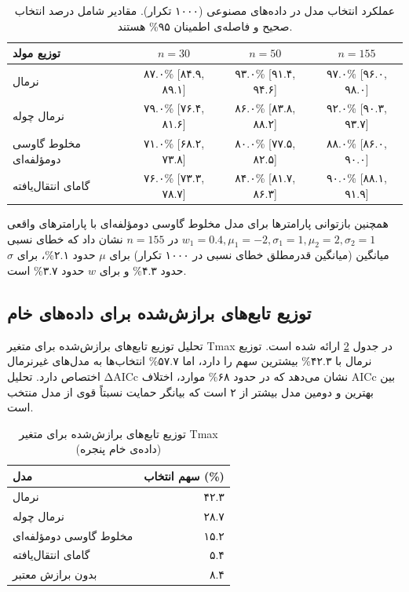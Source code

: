 \documentclass[12pt,a4paper,twocolumn]{article}
\begin{document}
\begin{table}[h]
\centering
\caption{عملکرد انتخاب مدل در داده‌های مصنوعی (۱۰۰۰ تکرار). مقادیر شامل درصد انتخاب صحیح و فاصله‌ی اطمینان ۹۵\% هستند.}
\label{tab:validation}
\begin{tabular}{l c c c}
\toprule
\textbf{توزیع مولد} & \textbf{$n=30$} & \textbf{$n=50$} & \textbf{$n=155$} \\
\midrule
نرمال & ۸۷.۰\% [۸۴.۹, ۸۹.۱] & ۹۳.۰\% [۹۱.۴, ۹۴.۶] & ۹۷.۰\% [۹۶.۰, ۹۸.۰] \\
نرمال چوله & ۷۹.۰\% [۷۶.۴, ۸۱.۶] & ۸۶.۰\% [۸۳.۸, ۸۸.۲] & ۹۲.۰\% [۹۰.۳, ۹۳.۷] \\
مخلوط گاوسی دومؤلفه‌ای & ۷۱.۰\% [۶۸.۲, ۷۳.۸] & ۸۰.۰\% [۷۷.۵, ۸۲.۵] & ۸۸.۰\% [۸۶.۰, ۹۰.۰] \\
گامای انتقال‌یافته & ۷۶.۰\% [۷۳.۳, ۷۸.۷] & ۸۴.۰\% [۸۱.۷, ۸۶.۳] & ۹۰.۰\% [۸۸.۱, ۹۱.۹] \\
\bottomrule
\end{tabular}
\end{table}

همچنین بازتوانی پارامترها برای مدل مخلوط گاوسی دومؤلفه‌ای با پارامترهای واقعی $w_1=0.4,\mu_1=-2,\sigma_1=1,\mu_2=2,\sigma_2=1$ در $n=155$ نشان داد که خطای نسبی میانگین (میانگین قدرمطلق خطای نسبی در ۱۰۰۰ تکرار) برای $\mu$ حدود ۲.۱\%، برای $\sigma$ حدود ۴.۳\% و برای $w$ حدود ۳.۷\% است.

\subsection{توزیع تابع‌های برازش‌شده برای داده‌های خام}
تحلیل توزیع تابع‌های برازش‌شده برای متغیر Tmax در جدول \ref{tab:selection} ارائه شده است. توزیع نرمال با ۴۲.۳\% بیشترین سهم را دارد، اما ۵۷.۷\% انتخاب‌ها به مدل‌های غیرنرمال اختصاص دارد. تحلیل ΔAICc نشان می‌دهد که در حدود ۶۸\% موارد، اختلاف AICc بین بهترین و دومین مدل بیشتر از ۲ است که بیانگر حمایت نسبتاً قوی از مدل منتخب است.

\begin{table}[h]
\centering
\caption{توزیع تابع‌های برازش‌شده برای متغیر Tmax (داده‌ی خام پنجره)}
\label{tab:selection}
\begin{tabular}{l r}
\toprule
\textbf{مدل} & \textbf{سهم انتخاب (\%)} \\
\midrule
نرمال & ۴۲.۳ \\
نرمال چوله & ۲۸.۷ \\
مخلوط گاوسی دومؤلفه‌ای & ۱۵.۲ \\
گامای انتقال‌یافته & ۵.۴ \\
بدون برازش معتبر & ۸.۴ \\
\bottomrule
\end{tabular}
\end{table}
\end{document}
